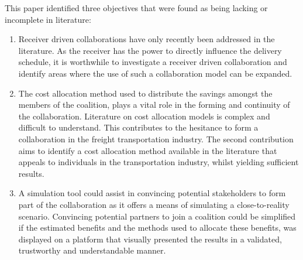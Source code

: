 This paper identified three objectives that were found as being lacking or incomplete in literature:
\begin{enumerate}
    \item Receiver driven collaborations have only recently been addressed in the literature. As the receiver has the power to directly influence the delivery schedule, it is worthwhile to investigate a receiver driven collaboration and identify areas where the use of such a collaboration model can be expanded.
    
    
    \item The cost allocation method used to distribute the savings amongst the members of the coalition, plays a vital role in the forming and continuity of the collaboration. Literature on cost allocation models is complex and difficult to understand. This contributes to the hesitance to form a collaboration in the freight transportation industry. The second contribution aims to identify a cost allocation method available in the literature that appeals to individuals in the transportation industry, whilst yielding sufficient results.
    
    
    \item A simulation tool could assist in convincing potential stakeholders to form part of the collaboration as it offers a means of simulating a close-to-reality scenario. Convincing potential partners to join a coalition could be simplified if the estimated benefits and the methods used to allocate these benefits, was displayed on a platform that visually presented the results in a validated, trustworthy and understandable manner.
    
\end{enumerate}

